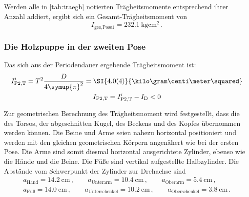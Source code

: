 Werden alle in \ref{tab:traegh} notierten Trägheitsmomente entsprechend ihrer Anzahl addiert, ergibt sich ein 
Gesamt-Trägheitsmoment von 
\begin{equation}
    I_\text{geo,Pose1}=\SI{232.1}{\kilo\gram\centi\meter\squared}\,.
\end{equation}


\FloatBarrier
\subsubsection{Die Holzpuppe in der zweiten Pose}

Das sich aus der Periodendauer ergebende Trägheitsmoment ist: 
\begin{gather}
    I'_\text{P2,T}=T^2\frac{D}{4\symup{\pi}^2}=\SI{4.0(4)}{\kilo\gram\centi\meter\squared} \\
    I_\text{P2,T}=I'_\text{P2,T}-I_\text{D} <0 
\end{gather}

Zur geometrischen Berechnung des Trägheitsmoment wird festgestellt, dass die des Torsos, der abgeschnitten Kugel, des 
Beckens und des Kopfes übernommen werden können. 
Die Beine und Arme seien nahezu horizontal positioniert und werden mit den gleichen geometrischen Körpern angenähert 
wie bei der ersten Pose.
Die Arme sind somit diesmal horizontal ausgerichtete Zylinder, ebenso wie die Hände und die Beine. Die Füße sind vertikal aufgestellte Halbzylinder. 
Die Abstände vom Schwerpunkt der Zylinder zur Drehachse sind 
\begin{gather}
    a_\text{Hand}=\SI{14.2}{\centi\meter}\,,   \quad \quad 
    a_\text{Unterarm}=\SI{10.4}{\centi\meter}\,,\quad \quad 
    a_\text{Oberarm}=\SI{5.4}{\centi\meter}\,, \\
    a_\text{Fuß}=\SI{14.0}{\centi\meter} \,,\quad \quad
    a_\text{Unterschenkel}=\SI{10.2}{\centi\meter}\,, \quad \quad
    a_\text{Oberschenkel}=\SI{3.8}{\centi\meter} \,.
\end{gather}


